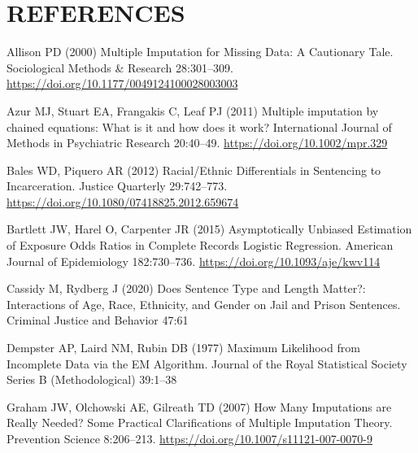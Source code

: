 \documentclass[
  letterpaper,
  DIV=11,
  numbers=noendperiod]{scrartcl}
\newlength{\cslhangindent}
\newlength{\cslentryspacingunit} %
\newenvironment{CSLReferences}[2] %
 {%
  \setlength{\parindent}{0pt}
  \ifodd #1
  \let\oldpar\par
  \def\par{\hangindent=\cslhangindent\oldpar}
  \fi
  \setlength{\parskip}{#2\cslentryspacingunit}
 }%
 {}
\begin{document}
\hypertarget{references}{%
\section*{REFERENCES}\label{references}}

\hypertarget{refs}{}
\begin{CSLReferences}{1}{0}
\leavevmode{}%
Allison PD (2000) Multiple {Imputation} for {Missing Data}: {A
Cautionary Tale}. Sociological Methods \& Research 28:301--309.
\url{https://doi.org/10.1177/0049124100028003003}

\leavevmode{}%
Azur MJ, Stuart EA, Frangakis C, Leaf PJ (2011) Multiple imputation by
chained equations: What is it and how does it work? International
Journal of Methods in Psychiatric Research 20:40--49.
\url{https://doi.org/10.1002/mpr.329}

\leavevmode{}%
Bales WD, Piquero AR (2012) Racial/{Ethnic Differentials} in
{Sentencing} to {Incarceration}. Justice Quarterly 29:742--773.
\url{https://doi.org/10.1080/07418825.2012.659674}

\leavevmode{}%
Bartlett JW, Harel O, Carpenter JR (2015) Asymptotically {Unbiased
Estimation} of {Exposure Odds Ratios} in {Complete Records Logistic
Regression}. American Journal of Epidemiology 182:730--736.
\url{https://doi.org/10.1093/aje/kwv114}

\leavevmode{}%
Cassidy M, Rydberg J (2020) Does {Sentence Type} and {Length Matter}?:
{Interactions} of {Age}, {Race}, {Ethnicity}, and {Gender} on {Jail} and
{Prison Sentences}. Criminal Justice and Behavior 47:61

\leavevmode{}%
Dempster AP, Laird NM, Rubin DB (1977) Maximum {Likelihood} from
{Incomplete Data} via the {EM Algorithm}. Journal of the Royal
Statistical Society Series B (Methodological) 39:1--38

\leavevmode{}%
Graham JW, Olchowski AE, Gilreath TD (2007) How {Many Imputations} are
{Really Needed}? {Some Practical Clarifications} of {Multiple Imputation
Theory}. Prevention Science 8:206--213.
\url{https://doi.org/10.1007/s11121-007-0070-9}


\end{CSLReferences}
\end{document}

